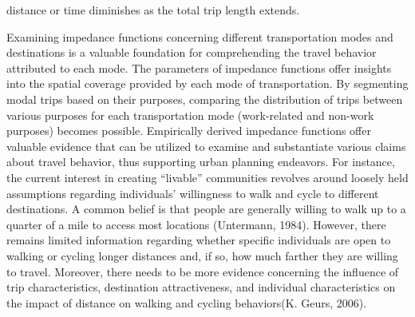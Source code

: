 \documentclass[12pt,twoside]{reedthesis}
\begin{document}
distance or time diminishes as the total trip length extends.

Examining impedance functions concerning different transportation modes and destinations is a valuable foundation for comprehending the travel behavior attributed to each mode. The parameters of impedance functions offer insights into the spatial coverage provided by each mode of transportation. By segmenting modal trips based on their purposes, comparing the distribution of trips between various purposes for each transportation mode (work-related and non-work purposes) becomes possible. Empirically derived impedance functions offer valuable evidence that can be utilized to examine and substantiate various claims about travel behavior, thus supporting urban planning endeavors. For instance, the current interest in creating ``livable'' communities revolves around loosely held assumptions regarding individuals' willingness to walk and cycle to different destinations. A common belief is that people are generally willing to walk up to a quarter of a mile to access most locations (Untermann, 1984). However, there remains limited information regarding whether specific individuals are open to walking or cycling longer distances and, if so, how much farther they are willing to travel. Moreover, there needs to be more evidence concerning the influence of trip characteristics, destination attractiveness, and individual characteristics on the impact of distance on walking and cycling behaviors(K. Geurs, 2006).
\end{document}
